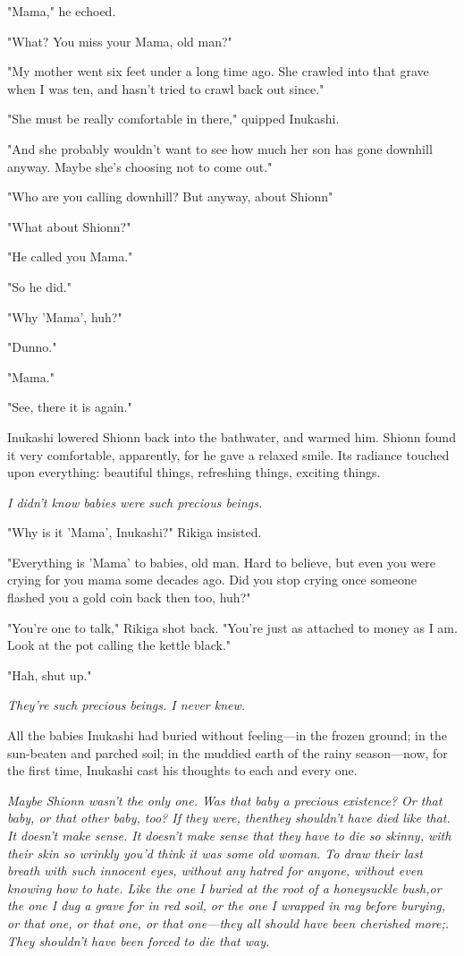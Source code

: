 "Mama," he echoed.

"What? You miss your Mama, old man?"

"My mother went six feet under a long time ago. She crawled into that
grave when I was ten, and hasn't tried to crawl back out since."

"She must be really comfortable in there," quipped Inukashi.~

"And she probably wouldn't want to see how much her son has gone
downhill anyway. Maybe she's choosing not to come out."

"Who are you calling downhill? But anyway, about Shionn\el "

"What about Shionn?"

"He called you Mama."

"So he did."

"Why 'Mama', huh?"

"Dunno."

"Mama."

"See, there it is again."

Inukashi lowered Shionn back into the bathwater, and warmed him. Shionn
found it very comfortable, apparently, for he gave a relaxed smile. Its
radiance touched upon everything: beautiful things, refreshing things,
exciting things.

\emph{I didn't know babies were such precious beings.}

"Why is it 'Mama', Inukashi?" Rikiga insisted.

"Everything is 'Mama' to babies, old man. Hard to believe, but even you
were crying for you mama some decades ago. Did you stop crying once
someone flashed you a gold coin back then too, huh?"

"You're one to talk," Rikiga shot back. "You're just as attached to
money as I am. Look at the pot calling the kettle black."

"Hah, shut up."

\emph{They're such precious beings. I never knew.}

All the babies Inukashi had buried without feeling---in the frozen ground;
in the sun-beaten and parched soil; in the muddied earth of the rainy
season---now, for the first time, Inukashi cast his thoughts to each and
every one.

\emph{Maybe Shionn wasn't the only one. Was that baby a precious existence? Or
that baby, or that other baby, too? If they were, then\el they shouldn't
have died like that. It doesn't make sense. It doesn't make sense that
they have to die so skinny, with their skin so wrinkly you'd think it
was some old woman. To draw their last breath with such innocent eyes,
without any hatred for anyone, without even knowing how to hate. Like
the one I buried at the root of a honeysuckle bush,or the one I dug a
grave for in red soil, or the one I wrapped in rag before burying, or
that one, or that one, or that one---they all should have been cherished
more;. They shouldn't have been forced to die that way.}

